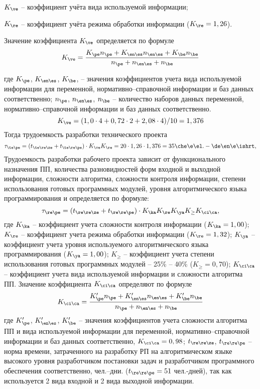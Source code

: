 $K_{\ve}$ -- коэффициент учёта вида используемой информации;

$K_{\re}$ -- коэффициент учёта режима обработки информации ($K_{\re} = 1,26$).

Значение коэффициента $K_{\ve}$ определяется по формуле
\begin{equation*}
    K_{\ve} = \frac{K_{\pe}n_{\pe} + K_{\en\es}n_{\en\es} + K_{\be}n_{\be}}{n_{\pe} + n_{\en\es} + n_{\be}}
\end{equation*}
 
где	$K_{\pe}$, $K_{\en\es}$, $K_{\be}$, -- значения коэффициентов учета вида используемой информации для переменной, нормативно–справочной информации и баз данных соответственно;
$n_{\pe}$, $n_{\en\es}$, $n_{\be}$ -- количество наборов данных переменной, нормативно–справочной информации и баз данных соответственно. 
\begin{equation*}
	K_{\ve} = (1,0\cdot4 + 0,72\cdot2 + 2,08\cdot4)/10 = 1,376
\end{equation*}
Тогда трудоемкость разработки технического проекта
\begin{equation*}
	\tau_{\te\pe} = (t_{\te\re\ze} + t_{\te\re\pe}) \cdot K_{\ve} K_{\re} = 20 \cdot 1,26 \cdot 1,376 = 35 \che\e\el.-\de\en\e\ishrt,
\end{equation*}
Трудоемкость разработки рабочего проекта зависит от функционального назначения ПП, количества разновидностей форм входной и выходной информации, сложности алгоритма, сложности контроля информации, степени использования готовых программных модулей, уровня алгоритмического языка программирования и определяется по формуле:
\begin{equation*}
	\tau_{\re\pe} = (t_{\re\re\ze} + t_{\re\re\pe}) \cdot K_{\ka} K_{\re} K_{\ya} K_{\ge} K_{\ci\ca},
\end{equation*}
где $K_{\ka}$ -- коэффициент учета сложности контроля информации ($K_{\ka} = 1,00$);
$K_{\re}$ -- коэффициент учета режима обработки информации ($K_{\re} = 1,32$); 
$K_{\ya}$ -- коэффициент учета уровня используемого алгоритмического языка программирования ($K_{\ya} = 1,00$); 
$K_{\ge}$ -- коэффициент учета степени использования готовых программных модулей -- 25\% – 40\% ($K_{\ge} = 0,70$); 
$K_{\ci\ca}$ -- коэффициент учета вида используемой информации и сложности алгоритма ПП.
Значение коэффициента $K_{\ci\ca}$ определяют по формуле
\begin{equation*}
    K_{\ci\ca} = \frac{K'_{\pe}n_{\pe} + K'_{\en\es}n_{\en\es} + K'_{\be}n_{\be}}{n_{\pe} + n_{\en\es} + n_{\be}}
\end{equation*}
где $K'_{\pe}$, $K'_{\en\es}$, $K'_{\be}$ -- значения коэффициентов учета сложности алгоритма ПП и вида используемой информации для переменной, нормативно–справочной информации и баз данных соответственно, $K_{\ci\ca} = 0,98$;
$t_{\re\re\ze}$, $t_{\re\re\pe}$ -- норма времени, затраченного на разработку РП на алгоритмическом языке высокого уровня разработчиком постановки задач и разработчиком программного обеспечения соответственно, чел.–дни. ($t_{\re\re\pe} = 51$ чел.-дней), так как используется 2 вида входной и 2 вида выходной информации.
 
